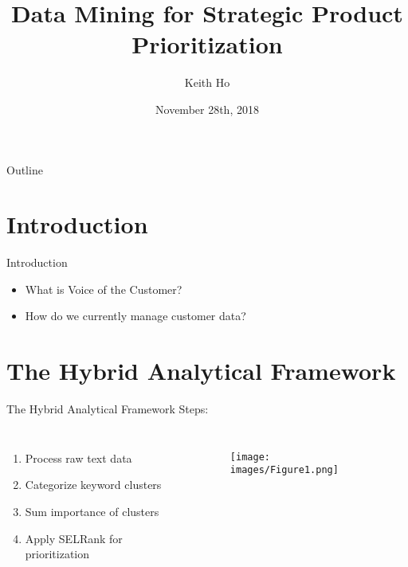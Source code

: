 \documentclass{beamer}
\title[Your Short Title]{Data Mining for Strategic Product Prioritization}
\author{Keith Ho}
\institute{University of California, Santa Cruz}
\date{November 28th, 2018}
\begin{document}
\begin{frame}
  \titlepage
\end{frame}

\begin{frame}{Outline}
  \tableofcontents
\end{frame}

\section{Introduction}

\begin{frame}{Introduction}

\begin{itemize}
  \item What is Voice of the Customer? 
  \item How do we currently manage customer data?
\end{itemize}

\vskip 1cm
\end{frame}

\section{The Hybrid Analytical Framework}
\begin{frame}{The Hybrid Analytical Framework}
Steps:
\begin{columns}
    \begin{enumerate}
        \item Process raw text data
        \item Categorize keyword clusters
        \item Sum importance of clusters
        \item Apply SELRank for prioritization
     \end{enumerate}

    \begin{figure}
    \texttt{[image: images/Figure1.png]}
    \end{figure}
\end{columns}
\end{frame}
\end{document}
